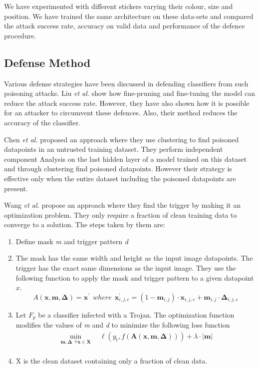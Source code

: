 \documentclass{article}
\newcommand{\etal}[0]{\emph{et al.}}
\begin{document}
We have experimented with different stickers varying their colour, size and position. We have trained the same architecture on these data-sets and compared the attack success rate, accuracy on valid data and performance of the defence procedure.

\subsection{Defense Method}
Various defense strategies have been discussed in defending classifiers from such poisoning attacks. Liu \etal \cite{2018arXiv180512185L} show how fine-pruning and fine-tuning the model can reduce the attack success rate. However, they have also shown how it is possible for an attacker to circumvent these defences. Also, their method reduces the accuracy of the classifier.

Chen \etal \cite{chenDetectingBackdoorAttacks2018} proposed an approach where they use clustering to find poisoned datapoints in an untrusted training dataset. They perform independent component Analysis on the last hidden layer of a model trained on this dataset and through clustering find poisoned datapoints. However their strategy is effective only when the entire dataset including the poisoned datapoints are present.

Wang \etal \cite{wangNeuralCleanseIdentifying} propose an approach where they find the trigger by making it an optimization problem. They only require a fraction of clean training data to converge to a solution. The steps taken by them are:
\begin{enumerate}
    \item Define mask \emph{m} and trigger pattern \emph{d}
    \item The mask has the same width and height as the input image datapoints. The trigger has the exact same dimensions as the input image. They use the following function to apply the mask and trigger pattern to a given datapoint \(x\).
    \begin{equation}
        \label{A_x}
        {A(\boldsymbol{x}, \boldsymbol{m}, \boldsymbol{\Delta})=\boldsymbol{x}^{\prime}} \ \  where \ \ \boldsymbol{x}_{i, j, c}^{\prime}=\left(1-\boldsymbol{m}_{i, j}\right) \cdot \boldsymbol{x}_{i, j, c}+\boldsymbol{m}_{i, j} \cdot \boldsymbol{\Delta}_{i, j, c}
    \end{equation}
    \item Let \(F_p\) be a classifier infected with a Trojan. The optimization function modifies the values of \emph{m} and \emph{d} to minimize the following loss function
    \begin{equation}
        \label{loss}
        \begin{array}{l}{\min\limits_{\boldsymbol{m}, \boldsymbol{\Delta}\ \  {\forall \boldsymbol{x} \in \boldsymbol{X}}} \quad \ell\left(y_{t}, f(\boldsymbol{A}(\boldsymbol{x}, \boldsymbol{m}, \boldsymbol{\Delta}))\right)+\lambda \cdot|\boldsymbol{m}|} \\ \end{array}
    \end{equation}
    \item X is the clean dataset containing only a fraction of clean data.
\end{enumerate}
\end{document}
